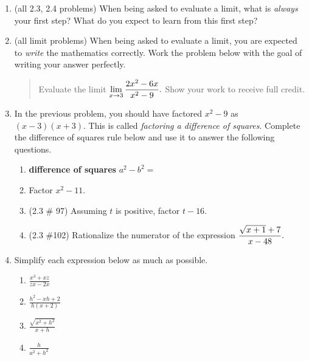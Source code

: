 \documentclass[11pt,fleqn]{article}
\begin{document}
\begin{enumerate}
\item (all 2.3, 2.4 problems) When being asked to evaluate a limit, what is \emph{always} your first step? What do you expect to learn from this first step?\\
\vfill
\item (all limit problems) When being asked to evaluate a limit, you are expected to \emph{write} the mathematics correctly. Work the problem below with the goal of writing your answer perfectly. \\

\begin{quote} Evaluate the limit $\displaystyle \lim_{x \to 3} \frac{2x^2-6x}{x^2-9}.$ Show your work to receive full credit. \end{quote}
\vfill


\item In the previous problem, you should have factored $x^2-9$ as $(x-3)(x+3).$ This is called \emph{factoring a difference of squares}. Complete the difference of squares rule below and use it to answer the following questions.
	\begin{enumerate}
	\item \textbf{difference of squares} $a^2-b^2=$\\
	\item Factor $x^2-11.$
	\vfill
	\item (2.3 \# 97) Assuming $t$ is positive, factor $t-16.$
	\vfill
	\item (2.3 \#102) Rationalize the numerator of the expression $\displaystyle \frac{\sqrt{x+1} +7}{x-48} .$
	\vfill 
	\end{enumerate}
	\newpage

\item Simplify each expression below as much as possible.			                  \begin{enumerate}
		\item $\frac{x^3+xz}{zx-2x}$\\
		\vfill
		
		\item $\frac{h^2-xh+2}{h(x+2)}$\\
		\vfill
		
		\item $\frac{\sqrt{x^2+h^2}}{x+h}$\\
		\vfill
		
		\item $\frac{h}{a^2+h^2}$\\
		\vfill
		

\end{enumerate}
\end{enumerate}
\end{document}
